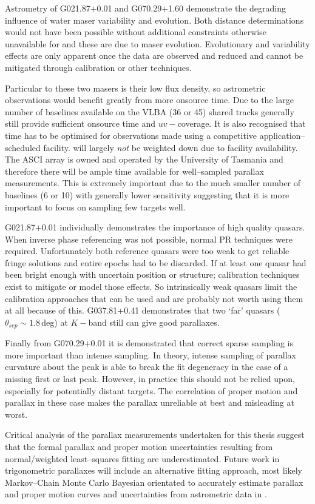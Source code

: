 		Astrometry of G021.87$+$0.01 and G070.29$+$1.60 demonstrate the degrading influence of water maser variability and evolution. Both distance determinations would not have been possible without additional constraints otherwise unavailable for \spirals\space and these are due to maser evolution. Evolutionary and variability effects are only apparent once the data are observed and reduced and cannot be mitigated through calibration or other techniques.
		
		Particular to these two masers is their low flux density, so astrometric observations would benefit greatly from more onsource time. Due to the large number of baselines available on the VLBA (36 or 45) shared tracks generally still provide sufficient onsource time and $uv-$coverage. It is also recognised that time has to be optimised for observations made using a competitive application--scheduled facility. \spirals\space will largely \textit{not} be weighted down due to facility availability. The ASCI array is owned and operated by the University of Tasmania and therefore there will be ample time available for well--sampled parallax measurements. This is extremely important due to the much smaller number of baselines (6 or 10) with generally lower sensitivity suggesting that it is more important to focus on sampling few targets well.
		
		G021.87$+$0.01 individually demonstrates the importance of high quality quasars. When inverse phase referencing was not possible, normal PR techniques were required. Unfortunately both reference quasars were too weak to get reliable fringe solutions and entire epochs had to be discarded. If at least one quasar had been bright enough with uncertain position or structure; calibration techniques exist to mitigate or model those effects. So intrinsically weak quasars limit the calibration approaches that can be used and are probably not worth using them at all because of this. G037.81+0.41 demonstrates that two `far' quasars ($\theta_{sep}\sim1.8$\,deg) at $K-$band still can give good parallaxes.
				
		Finally from G070.29$+$0.01 it is demonstrated that correct sparse sampling is more important than intense sampling. In theory, intense sampling of parallax curvature about the peak is able to break the fit degeneracy in the case of a missing first or last peak. However, in practice this should not be relied upon, especially for potentially distant targets. The correlation of proper motion and parallax in these case makes the parallax unreliable at best and misleading at worst. 
		
		Critical analysis of the parallax measurements undertaken for this thesis suggest that the formal parallax and proper motion uncertainties resulting from normal/weighted least--squares fitting are underestimated. Future work in trigonometric parallaxes will include an alternative fitting approach, most likely Markov--Chain Monte Carlo Bayesian orientated to accurately estimate parallax and proper motion curves and uncertainties from astrometric data in \spirals.
	
		
		
		